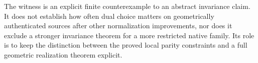 The witness is an explicit finite counterexample to an abstract
invariance claim.  It does not establish how often dual choice matters
on geometrically authenticated sources after other normalization
improvements, nor does it exclude a stronger invariance theorem for a
more restricted native family.  Its role is to keep the distinction
between the proved local parity constraints and a full geometric
realization theorem explicit.
